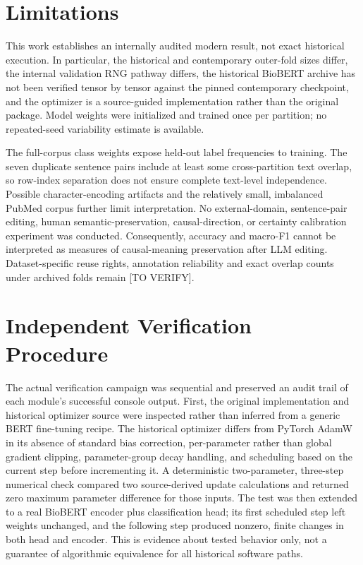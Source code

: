 \documentclass[conference]{IEEEtran}
\begin{document}
\section{Limitations}\label{sec:limits}
This work establishes an internally audited modern result, not exact historical execution. In particular, the historical and contemporary outer-fold sizes differ, the internal validation RNG pathway differs, the historical BioBERT archive has not been verified tensor by tensor against the pinned contemporary checkpoint, and the optimizer is a source-guided implementation rather than the original package. Model weights were initialized and trained once per partition; no repeated-seed variability estimate is available.

The full-corpus class weights expose held-out label frequencies to training. The seven duplicate sentence pairs include at least some cross-partition text overlap, so row-index separation does not ensure complete text-level independence. Possible character-encoding artifacts and the relatively small, imbalanced PubMed corpus further limit interpretation. No external-domain, sentence-pair editing, human semantic-preservation, causal-direction, or certainty calibration experiment was conducted. Consequently, accuracy and macro-F1 cannot be interpreted as measures of causal-meaning preservation after LLM editing. Dataset-specific reuse rights, annotation reliability and exact overlap counts under archived folds remain [TO VERIFY].


\section{Independent Verification Procedure}\label{sec:verification}
The actual verification campaign was sequential and preserved an audit trail of each module's successful console output. First, the original implementation and historical optimizer source were inspected rather than inferred from a generic BERT fine-tuning recipe. The historical optimizer differs from PyTorch AdamW in its absence of standard bias correction, per-parameter rather than global gradient clipping, parameter-group decay handling, and scheduling based on the current step before incrementing it. A deterministic two-parameter, three-step numerical check compared two source-derived update calculations and returned zero maximum parameter difference for those inputs. The test was then extended to a real BioBERT encoder plus classification head; its first scheduled step left weights unchanged, and the following step produced nonzero, finite changes in both head and encoder. This is evidence about tested behavior only, not a guarantee of algorithmic equivalence for all historical software paths.
\end{document}

